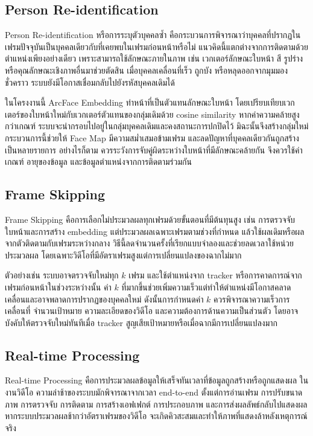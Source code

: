 \subsection{Person Re-identification}

Person Re-identification หรือการระบุตัวบุคคลซ้ำ คือกระบวนการพิจารณาว่าบุคคลที่ปรากฏในเฟรมปัจจุบันเป็นบุคคลเดียวกับที่เคยพบในเฟรมก่อนหน้าหรือไม่ แนวคิดนี้แตกต่างจากการติดตามด้วยตำแหน่งเพียงอย่างเดียว เพราะสามารถใช้ลักษณะภายในภาพ เช่น เวกเตอร์ลักษณะใบหน้า สี รูปร่าง หรือคุณลักษณะเชิงภาพอื่นมาช่วยตัดสิน เมื่อบุคคลเคลื่อนที่เร็ว ถูกบัง หรือหลุดออกจากมุมมองชั่วคราว ระบบยังมีโอกาสเชื่อมกลับไปยังรหัสบุคคลเดิมได้ \cite{deng2019arcface,bewley2016sort}

ในโครงงานนี้ ArcFace Embedding ทำหน้าที่เป็นตัวแทนลักษณะใบหน้า โดยเปรียบเทียบเวกเตอร์ของใบหน้าใหม่กับเวกเตอร์ตัวแทนของกลุ่มเดิมด้วย cosine similarity หากค่าความคล้ายสูงกว่าเกณฑ์ ระบบจะนำกรอบไปอยู่ในกลุ่มบุคคลเดิมและคงสถานะการปกปิดไว้ มิฉะนั้นจึงสร้างกลุ่มใหม่ กระบวนการนี้ช่วยให้ Face Map มีความสม่ำเสมอข้ามเฟรม และลดปัญหาที่บุคคลเดียวกันถูกสร้างเป็นหลายรายการ อย่างไรก็ตาม ควรระวังการจับคู่ผิดระหว่างใบหน้าที่มีลักษณะคล้ายกัน จึงควรใช้ค่าเกณฑ์ อายุของข้อมูล และข้อมูลตำแหน่งจากการติดตามร่วมกัน

\subsection{Frame Skipping}

Frame Skipping คือการเลือกไม่ประมวลผลทุกเฟรมด้วยขั้นตอนที่มีต้นทุนสูง เช่น การตรวจจับใบหน้าและการสร้าง embedding แต่ประมวลผลเฉพาะเฟรมตามช่วงที่กำหนด แล้วใช้ผลเดิมหรือผลจากตัวติดตามกับเฟรมระหว่างกลาง วิธีนี้ลดจำนวนครั้งที่เรียกแบบจำลองและช่วยลดเวลาใช้หน่วยประมวลผล โดยเฉพาะวิดีโอที่มีอัตราเฟรมสูงแต่การเปลี่ยนแปลงของฉากไม่มาก \cite{zhu2017flow}

ตัวอย่างเช่น ระบบอาจตรวจจับใหม่ทุก $k$ เฟรม และใช้ตำแหน่งจาก tracker หรือการคาดการณ์จากเฟรมก่อนหน้าในช่วงระหว่างนั้น ค่า $k$ ที่มากขึ้นช่วยเพิ่มความเร็วแต่ทำให้ตำแหน่งมีโอกาสคลาดเคลื่อนและอาจพลาดการปรากฏของบุคคลใหม่ ดังนั้นการกำหนดค่า $k$ ควรพิจารณาความเร็วการเคลื่อนที่ จำนวนเป้าหมาย ความละเอียดของวิดีโอ และความต้องการด้านความเป็นส่วนตัว โดยอาจบังคับให้ตรวจจับใหม่ทันทีเมื่อ tracker สูญเสียเป้าหมายหรือเมื่อฉากมีการเปลี่ยนแปลงมาก

\subsection{Real-time Processing}

Real-time Processing คือการประมวลผลข้อมูลให้เสร็จทันเวลาที่ข้อมูลถูกสร้างหรือถูกแสดงผล ในงานวิดีโอ ความล่าช้าของระบบมักพิจารณาจากเวลา end-to-end ตั้งแต่การอ่านเฟรม การปรับขนาดภาพ การตรวจจับ การติดตาม การสร้างเอฟเฟกต์ การประกอบภาพ และการส่งผลลัพธ์กลับไปแสดงผล หากระบบประมวลผลช้ากว่าอัตราเฟรมของวิดีโอ จะเกิดคิวสะสมและทำให้ภาพที่แสดงล้าหลังเหตุการณ์จริง \cite{bewley2016sort}

